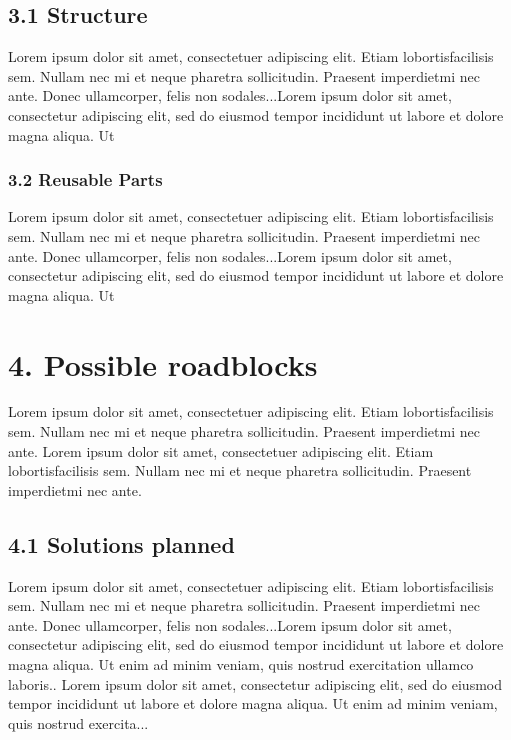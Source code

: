 \documentclass[a4paper, twoside]{report}
\begin{document}
\subsection*{3.1 Structure}
Lorem  ipsum  dolor  sit  amet,  consectetuer  adipiscing  
elit.   Etiam  lobortisfacilisis sem.  Nullam nec mi et 
neque pharetra sollicitudin.  Praesent imperdietmi nec ante. 
Donec ullamcorper, felis non sodales...Lorem ipsum dolor sit amet, consectetur adipiscing elit, sed do 
eiusmod tempor incididunt ut labore et dolore magna aliqua. Ut 
\subsubsection*{3.2 Reusable Parts}
Lorem  ipsum  dolor  sit  amet,  consectetuer  adipiscing  
elit.   Etiam  lobortisfacilisis sem.  Nullam nec mi et 
neque pharetra sollicitudin.  Praesent imperdietmi nec ante. 
Donec ullamcorper, felis non sodales...Lorem ipsum dolor sit amet, consectetur adipiscing elit, sed do 
eiusmod tempor incididunt ut labore et dolore magna aliqua. Ut 


\section*{}

\section*{4. Possible roadblocks}
Lorem  ipsum  dolor  sit  amet,  consectetuer  adipiscing  
elit.   Etiam  lobortisfacilisis sem.  Nullam nec mi et 
neque pharetra sollicitudin.  Praesent imperdietmi nec ante. 
Lorem  ipsum  dolor  sit  amet,  consectetuer  adipiscing  
elit.   Etiam  lobortisfacilisis sem.  Nullam nec mi et 
neque pharetra sollicitudin.  Praesent imperdietmi nec ante. 
\subsection*{4.1 Solutions planned}
Lorem  ipsum  dolor  sit  amet,  consectetuer  adipiscing  
elit.   Etiam  lobortisfacilisis sem.  Nullam nec mi et 
neque pharetra sollicitudin.  Praesent imperdietmi nec ante. 
Donec ullamcorper, felis non sodales...Lorem ipsum dolor sit amet, consectetur adipiscing elit, sed do 
eiusmod tempor incididunt ut labore et dolore magna aliqua. Ut 
enim ad minim veniam, quis nostrud exercitation ullamco laboris..
 Lorem ipsum dolor sit amet, consectetur adipiscing elit, sed do 
eiusmod tempor incididunt ut labore et dolore magna aliqua. Ut 
enim ad minim veniam, quis nostrud exercita...
\end{document}
